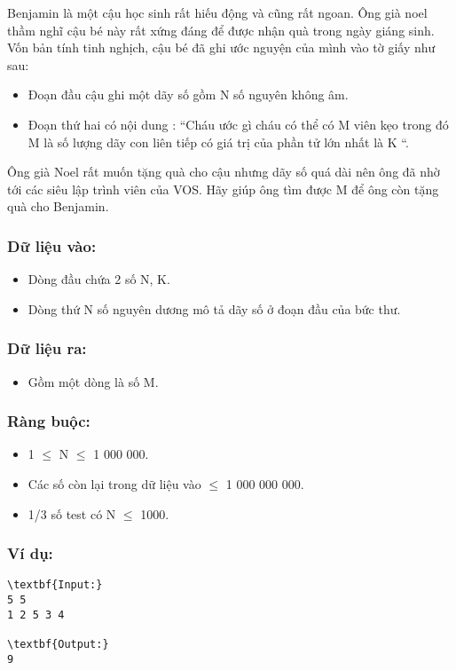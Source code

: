 

Benjamin là một cậu học sinh rất hiếu động và cũng rất ngoan. Ông già noel thầm nghĩ cậu bé này rất xứng đáng để được nhận quà trong ngày giáng sinh. Vốn bản tính tinh nghịch, cậu bé đã ghi ước nguyện của mình vào tờ giấy như sau:
\begin{itemize}
	\item Đoạn đầu cậu ghi một dãy số gồm N số nguyên không âm.
	\item Đoạn thứ hai có nội dung : “Cháu ước gì cháu có thể có M viên kẹo trong đó M là số lượng dãy con liên tiếp có giá trị của phần tử lớn nhất là K “.
\end{itemize}

Ông già Noel rất muốn tặng quà cho cậu nhưng dãy số quá dài nên ông đã nhờ tới các siêu lập trình viên của VOS. Hãy giúp ông tìm được M để ông còn tặng quà cho Benjamin.

\subsubsection{\textbf{Dữ liệu vào: }}
\begin{itemize}
	\item Dòng đầu chứa 2 số N, K.
	\item Dòng thứ N số nguyên dương mô tả dãy số ở đoạn đầu của bức thư.
\end{itemize}

\subsubsection{\textbf{Dữ liệu ra: }}
\begin{itemize}
	\item Gồm một dòng là số M.
\end{itemize}

\subsubsection{\textbf{Ràng buộc: }}
\begin{itemize}
	\item 1  $\le$  N  $\le$  1 000 000.
	\item Các số còn lại trong dữ liệu vào  $\le$  1 000 000 000.
	\item 1/3 số test có N  $\le$  1000.
\end{itemize}

\subsubsection{\textbf{Ví dụ: }}
\begin{verbatim}
\textbf{Input:}
5 5
1 2 5 3 4

\textbf{Output:}
9

\end{verbatim}
